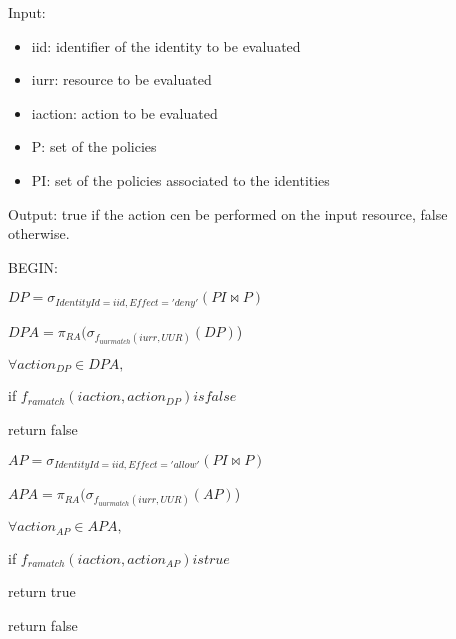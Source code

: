 \begin{boxF}
    \begin{definition}
        Input:
        \begin{itemize}
            \item iid: identifier of the identity to be evaluated
            \item iurr: resource to be evaluated
            \item iaction: action to be evaluated
            \item P: set of the policies
            \item PI: set of the policies associated to the identities
        \end{itemize}
        Output: true if the action cen be performed on the input resource, false otherwise.

        BEGIN:
            
        \hspace{2pt} $DP = \sigma_{IdentityId=iid, Effect='deny'}(PI \bowtie P)$
        
        \hspace{2pt} $DPA = \pi_{RA}(\sigma_{f_{uurmatch}(iurr, UUR)}(DP)$)

        \hspace{2pt} $\forall action_{DP} \in DPA,$
            
        \hspace{10pt} if $f_{ramatch}(iaction, action_{DP}) is false $ 
        
        \hspace{20pt} return false
        \vspace{10pt}
        
        \hspace{2pt} $AP = \sigma_{IdentityId=iid, Effect='allow'}(PI \bowtie P)$

        \hspace{2pt} $APA = \pi_{RA}(\sigma_{f_{uurmatch}(iurr, UUR)}(AP)$)

        \hspace{2pt} $\forall action_{AP} \in APA,$
            
        \hspace{10pt} if $f_{ramatch}(iaction, action_{AP}) is true $ 
        
        \hspace{20pt} return true
        \vspace{10pt}

        \hspace{2pt} return false
        \label{definition:policy-evaluation}
    \end{definition}
\end{boxF}

